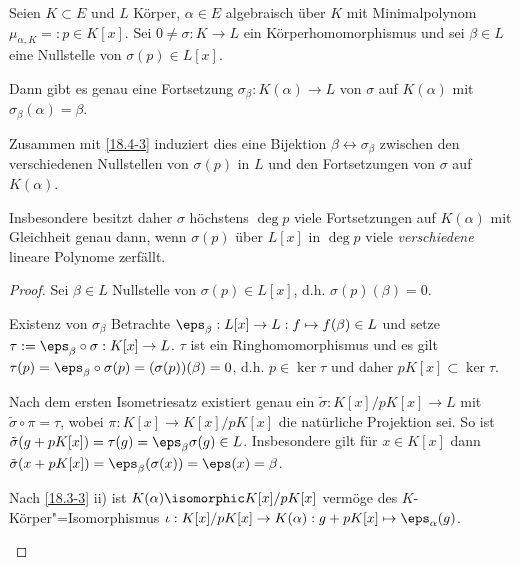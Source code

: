 \begin{st} \label{18.4-4}
	Seien $K \subset E$ und $L$ Körper, $\alpha \in E$ algebraisch über $K$ mit Minimalpolynom $\mu_{\alpha, K} =: p \in K[x]$.
	Sei $0 \neq \sigma: K \to L$ ein Körperhomomorphismus und sei $\beta \in L$ eine Nullstelle von $\sigma(p) \in L[x]$.

	Dann gibt es genau eine Fortsetzung $\sigma_\beta: K(\alpha) \to L$ von $\sigma$ auf $K(\alpha)$ mit $\sigma_\beta(\alpha) = \beta$.
	\begin{note}
		Zusammen mit \ref{18.4-3} induziert dies eine Bijektion $\beta \leftrightarrow \sigma_\beta$ zwischen den verschiedenen Nullstellen von $\sigma(p)$ in $L$ und den Fortsetzungen von $\sigma$ auf $K(\alpha)$.

		Insbesondere besitzt daher $\sigma$ höchstens $\deg p$ viele Fortsetzungen auf $K(\alpha)$ mit Gleichheit genau dann, wenn $\sigma(p)$ über $L[x]$ in $\deg p$ viele \emph{verschiedene} lineare Polynome zerfällt.
	\end{note}
	\begin{proof}
		Sei $\beta \in L$ Nullstelle von $\sigma(p) \in L[x]$, d.h. $\sigma(p)(\beta) = 0$.
		\begin{seg}{Existenz von $\sigma_\beta$}
			Betrachte $\eps_\beta: L[x] \to L : f \mapsto f(\beta) \in L$ und setze $\tau := \eps_\beta \circ \sigma: K[x] \to L$.
			$\tau$ ist ein Ringhomomorphismus und es gilt $\tau(p) = \eps_\beta \circ \sigma(p) = (\sigma(p))(\beta) = 0$, d.h. $p \in \ker \tau$ und daher $p K[x] \subset \ker \tau$.

			Nach dem ersten Isometriesatz existiert genau ein $\tilde \sigma: K[x] / p K[x] \to L$ mit $\tilde \sigma \circ \pi = \tau$, wobei $\pi: K[x] \to K[x] / pK[x]$ die natürliche Projektion sei.
			So ist $\tilde \sigma(g + pK[x]) = \tau(g) = \eps_\beta \sigma(g) \in L$.
			Insbesondere gilt für $x \in K[x]$ dann $\tilde \sigma(x + pK[x]) = \eps_\beta(\sigma(x)) = \eps(x) = \beta$.

			Nach \ref{18.3-3} ii) ist $K(\alpha) \isomorphic K[x] / pK[x]$ vermöge des $K$-Körper"=Isomorphismus $\iota: K[x] / pK[x] \to K(\alpha): g + pK[x] \mapsto \eps_\alpha(g)$.


\end{seg}
\end{proof}
\end{st}

